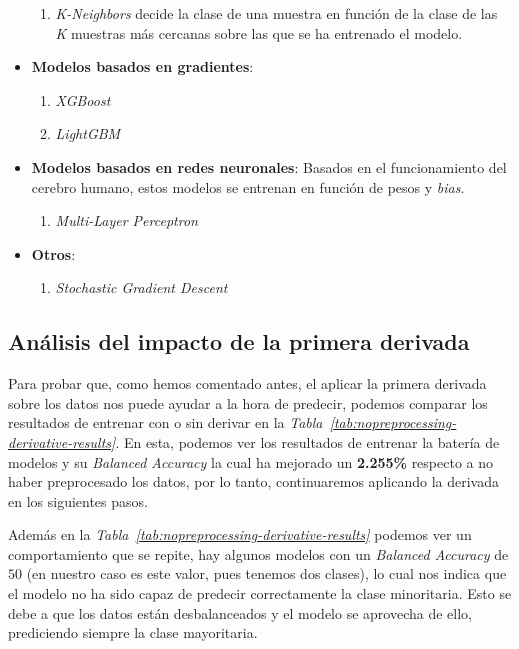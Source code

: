 \begin{itemize}
        \begin{enumerate}
            \item \textit{K-Neighbors} decide la clase de una muestra en función de la clase de las \textit{K} muestras más cercanas sobre las que se ha entrenado el modelo.
        \end{enumerate}
    \item \textbf{Modelos basados en gradientes}: 
    \begin{enumerate}
        \item \textit{XGBoost}
        \item \textit{LightGBM}
    \end{enumerate}
    \item \textbf{Modelos basados en redes neuronales}: Basados en el funcionamiento del cerebro humano, estos modelos se entrenan en función de pesos y \textit{bias}.
        \begin{enumerate}
            \item \textit{Multi-Layer Perceptron}
        \end{enumerate}
    \item \textbf{Otros}: 
    \begin{enumerate}
        \item \textit{Stochastic Gradient Descent}
    \end{enumerate}
\end{itemize}

\subsection{Análisis del impacto de la primera derivada}

Para probar que, como hemos comentado antes, el aplicar la primera derivada sobre los datos nos puede ayudar a la hora de predecir, podemos comparar los resultados de entrenar con o sin derivar en la \textit{Tabla\ \ref{tab:nopreprocessing-derivative-results}}. En esta, podemos ver los resultados de entrenar la batería de modelos y su \textit{Balanced Accuracy} la cual ha mejorado un \textbf{2.255\%} respecto a no haber preprocesado los datos, por lo tanto, continuaremos aplicando la derivada en los siguientes pasos.

Además en la \textit{Tabla\ \ref{tab:nopreprocessing-derivative-results}} podemos ver un comportamiento que se repite, hay algunos modelos con un \textit{Balanced Accuracy} de $50$ (en nuestro caso es este valor, pues tenemos dos clases), lo cual nos indica que el modelo no ha sido capaz de predecir correctamente la clase minoritaria. Esto se debe a que los datos están desbalanceados y el modelo se aprovecha de ello, prediciendo siempre la clase mayoritaria.


